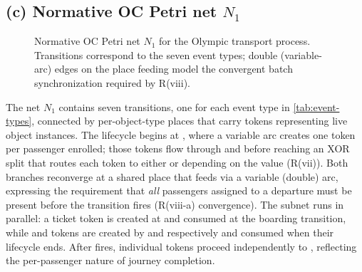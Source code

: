 \subsection{(c) Normative OC Petri net $N_1$}
\label{sec:c}

\begin{figure}[H]
\centering
\caption{Normative OC Petri net $N_1$ for the Olympic transport process.
Transitions correspond to the seven event types; double (variable-arc) edges
on the \otPassenger{} place feeding \etDepart{} model the convergent batch
synchronization required by R(viii).}
\label{fig:n1}
\end{figure}

The net $N_1$ contains seven transitions, one for each event type in
\cref{tab:event-types}, connected by per-object-type places that carry tokens
representing live object instances.
The \otPassenger{} lifecycle begins at \etBooking, where a variable arc creates
one token per passenger enrolled; those tokens flow through \etIssue{} and
\etAssign{} before reaching an XOR split that routes each token to either
\etBoard{} or \etValidate{} depending on the \attrFare{} value (R(vii)).
Both branches reconverge at a shared \otPassenger{} place that feeds
\etDepart{} via a variable (double) arc, expressing the requirement that
\emph{all} passengers assigned to a departure must be present before the
transition fires (R(viii-a) convergence).
The \otTicket{} subnet runs in parallel: a ticket token is created at
\etIssue{} and consumed at the boarding transition, while \otBooking{} and
\otDeparture{} tokens are created by \etBooking{} and \etAssign{} respectively
and consumed when their lifecycle ends.
After \etDepart{} fires, individual \otPassenger{} tokens proceed independently
to \etComplete, reflecting the per-passenger nature of journey completion.
